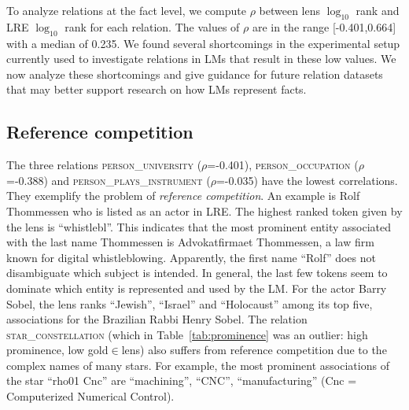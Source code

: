 \documentclass{article}
\begin{document}

To analyze relations at the fact level, we compute 
$\rho$ between lens $\log_{10}$ rank and LRE $\log_{10}$
rank for each relation.
The values of $\rho$ are in the range [-0.401,0.664] with a
median of
0.235. 
We found several shortcomings in the experimental setup currently used to investigate relations in LMs that result in these low values.
We now analyze these shortcomings and give
guidance for future relation datasets that may better support
research on how LMs represent facts.


\subsection{Reference competition}
\label{sec:competition}
The three relations 
\textsc{person\_university} ($\rho$=-0.401),
\textsc{person\_occupation} ($\rho$=-0.388) and
\textsc{person\_plays\_instrument} ($\rho$=-0.035) have the
lowest correlations.
They
exemplify the problem of 
\emph{reference competition}. An example is Rolf Thommessen
who is listed as an actor
in LRE. The highest ranked token given by the lens is
``whistlebl''. This indicates that the most prominent entity
associated with the last name Thommessen
is Advokatfirmaet
Thommessen, a law firm known for digital whistleblowing.
Apparently,  the first name ``Rolf''
does not disambiguate which subject is intended.
In general, the last few tokens seem to
dominate which entity is represented and used by the LM. For the actor Barry Sobel, the lens ranks
``Jewish'', ``Israel'' and ``Holocaust'' among its top five, associations for
the Brazilian Rabbi Henry Sobel. 
The relation \textsc{star\_constellation}
(which in Table~\ref{tab:prominence} was an outlier: high
prominence, low gold$\in$lens)
also suffers from
reference competition due to the complex names of
many stars. For example, the most prominent associations of
the star
``rho01 Cnc''
are ``machining'', ``CNC'', ``manufacturing''
(Cnc = Computerized Numerical Control).
\end{document}
